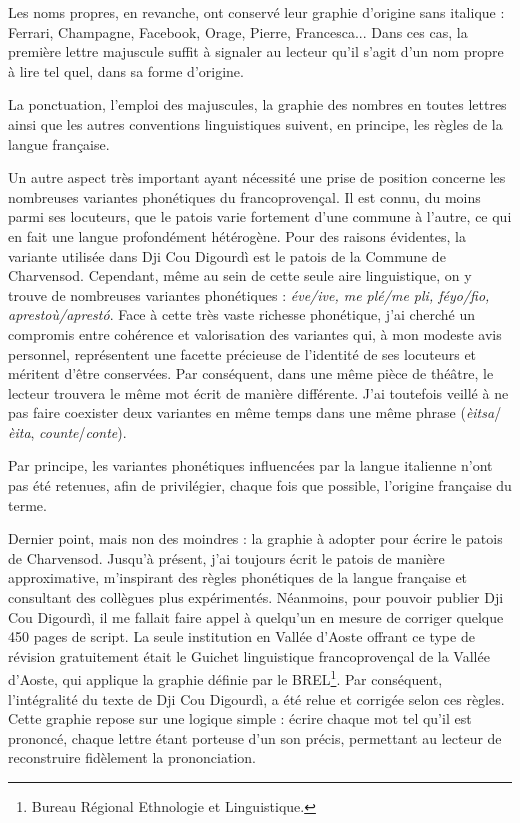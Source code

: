Les noms propres, en revanche, ont conservé leur graphie d'origine sans italique : Ferrari, Champagne, Facebook, Orage, Pierre, Francesca... Dans ces cas, la première lettre majuscule suffit à signaler au lecteur qu’il s’agit d’un nom propre à lire tel quel, dans sa forme d’origine.

La ponctuation, l'emploi des majuscules, la graphie des nombres en toutes lettres ainsi que les autres conventions linguistiques suivent, en principe, les règles de la langue française.

Un autre aspect très important ayant nécessité une prise de position concerne les nombreuses variantes phonétiques du francoprovençal. Il est connu, du moins parmi ses locuteurs, que le patois varie fortement d’une commune à l’autre, ce qui en fait une langue profondément hétérogène. Pour des raisons évidentes, la variante utilisée dans Dji Cou Digourdì est le patois de la Commune de Charvensod. Cependant, même au sein de cette seule aire linguistique, on y trouve de nombreuses variantes phonétiques : \textit{éve/ive, me plé/me pli, féyo/fio, aprestoù/aprestó}. Face à cette très vaste richesse phonétique, j'ai cherché un compromis entre cohérence et valorisation des variantes qui, à mon modeste avis personnel, représentent une facette précieuse de l'identité de ses locuteurs et méritent d’être conservées. Par conséquent, dans une même pièce de théâtre, le lecteur trouvera le même mot écrit de manière différente. J’ai toutefois veillé à ne pas faire coexister deux variantes en même temps dans une même phrase (\textit{èitsa}/\textit{èita}, \textit{counte}/\textit{conte}).

Par principe, les variantes phonétiques influencées par la langue italienne n'ont pas été retenues, afin de privilégier, chaque fois que possible, l'origine française du terme.

Dernier point, mais non des moindres : la graphie à adopter pour écrire le patois de Charvensod. Jusqu’à présent, j'ai toujours écrit le patois de manière approximative, m'inspirant des règles phonétiques de la langue française et consultant des collègues plus expérimentés. Néanmoins, pour pouvoir publier Dji Cou Digourdì, il me fallait faire appel à quelqu’un en mesure de corriger quelque 450 pages de script. La seule institution en Vallée d'Aoste offrant ce type de révision gratuitement était le Guichet linguistique francoprovençal de la Vallée d'Aoste, qui applique la graphie définie par le BREL\footnote{ Bureau Régional Ethnologie et Linguistique.}. Par conséquent, l'intégralité du texte de Dji Cou Digourdì, a été relue et corrigée selon ces règles. Cette graphie repose sur une logique simple : écrire chaque mot tel qu’il est prononcé, chaque lettre étant porteuse d’un son précis, permettant au lecteur de reconstruire fidèlement la prononciation.

